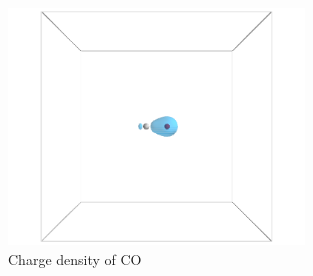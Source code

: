 \documentclass[11pt]{article}
\begin{document}
\begin{figure}[H]
\centering
\includegraphics[width=0.7\textwidth]{./co-density.png}
\caption{Charge density of CO}
\end{figure}
\end{document}
